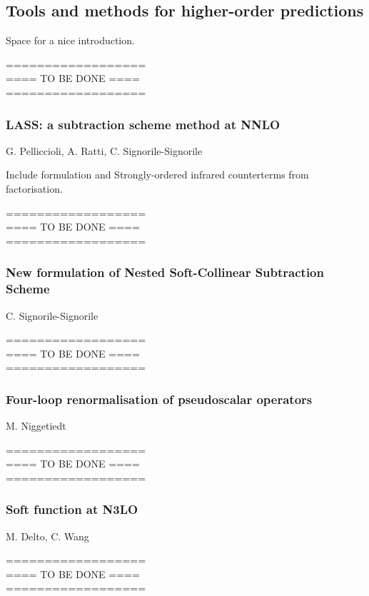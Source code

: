 \documentclass{FBR_Bericht_2025}
\begin{document}
\subsection{Tools and methods for higher-order predictions}
\begin{refsection}
Space for a nice introduction.

%
{\color{red} ==================\\ ====\; TO BE DONE\; ====\\ ==================}
%
\subsubsection{LASS: a subtraction scheme method at NNLO}
\begin{Namen}
G. Pelliccioli, A. Ratti, C. Signorile-Signorile
\end{Namen}
Include formulation and Strongly-ordered infrared counterterms from factorisation.

%
{\color{red} ==================\\ ====\; TO BE DONE\; ====\\ ==================}
%
\subsubsection{New formulation of Nested Soft-Collinear Subtraction Scheme}
\begin{Namen}
C. Signorile-Signorile
\end{Namen}
%
{\color{red} ==================\\ ====\; TO BE DONE\; ====\\ ==================}
%
\subsubsection{Four-loop renormalisation of pseudoscalar operators}
\begin{Namen}
M. Niggetiedt
\end{Namen}
%
{\color{red} ==================\\ ====\; TO BE DONE\; ====\\ ==================}
%
\subsubsection{Soft function at N3LO}
\begin{Namen}
M. Delto, C. Wang
\end{Namen}
%
{\color{red} ==================\\ ====\; TO BE DONE\; ====\\ ==================}
%

\end{refsection}
\end{document}
